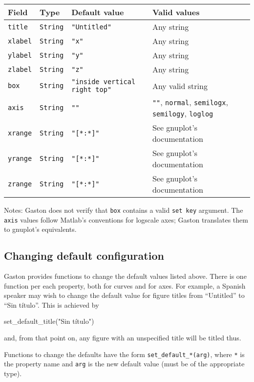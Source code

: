 \documentclass[11pt]{article}
\newcommand{\cmd}[1]{\texttt{#1}}
\begin{document}
{\small
\begin{center}
	\begin{tabular}{lp{1.5cm}p{2cm}p{7.5cm}}
	\toprule
	\textbf{Field} & \textbf{Type} & \textbf{Default value} & \textbf{Valid values} \\
	\midrule
	\cmd{title} & \cmd{String} & \cmd{"Untitled"} & Any string \\
	\cmd{xlabel} & \cmd{String} & \cmd{"x"} & Any string \\
	\cmd{ylabel} & \cmd{String} & \cmd{"y"} & Any string \\
	\cmd{zlabel} & \cmd{String} & \cmd{"z"} & Any string \\
	\cmd{box} & \cmd{String} & \cmd{"inside vertical right top"} & Any valid
	string \\
	\cmd{axis} & \cmd{String} & \cmd{""} & \cmd{""}, \cmd{normal},
	\cmd{semilogx}, \cmd{semilogy}, \cmd{loglog}  \\
	\cmd{xrange} & \cmd{String} & \cmd{"[*:*]"} & See gnuplot's documentation \\
	\cmd{yrange} & \cmd{String} & \cmd{"[*:*]"} & See gnuplot's documentation \\
	\cmd{zrange} & \cmd{String} & \cmd{"[*:*]"} & See gnuplot's documentation \\
	\bottomrule
\end{tabular}
\end{center}}

Notes: Gaston does not verify that \cmd{box} contains a valid \cmd{set key}
argument. The \cmd{axis} values follow Matlab's conventions for logscale axes;
Gaston translates them to gnuplot's equivalents.

\subsection{Changing default configuration}

Gaston provides functions to change the default values listed above. There is
one function per each property, both for curves and for axes. For example, a
Spanish speaker may wish to change the default value for figure titles from
``Untitled'' to ``Sin título''. This is achieved by
\begin{juliacode}
set_default_title("Sin título")
\end{juliacode}
and, from that point on, any figure with an unspecified title will be titled
thus.

Functions to change the defaults have the form \cmd{set\_default\_*(arg)},
where \texttt{*} is the property name and \cmd{arg} is the new default
value (must be of the appropriate type).
\end{document}
